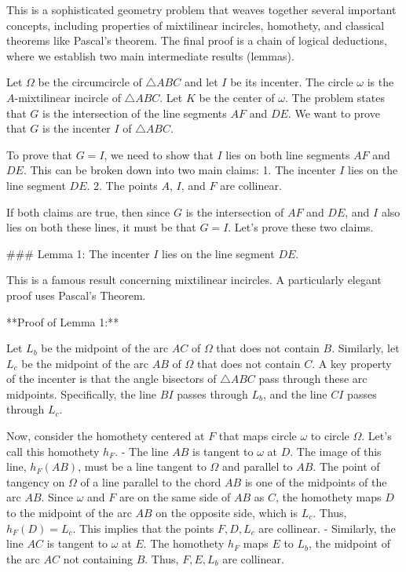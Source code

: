 This is a sophisticated geometry problem that weaves together several important concepts, including properties of mixtilinear incircles, homothety, and classical theorems like Pascal's theorem. The final proof is a chain of logical deductions, where we establish two main intermediate results (lemmas).

Let $\Omega$ be the circumcircle of $\triangle ABC$ and let $I$ be its incenter. The circle $\omega$ is the $A$-mixtilinear incircle of $\triangle ABC$. Let $K$ be the center of $\omega$. The problem states that $G$ is the intersection of the line segments $AF$ and $DE$. We want to prove that $G$ is the incenter $I$ of $\triangle ABC$.

To prove that $G=I$, we need to show that $I$ lies on both line segments $AF$ and $DE$. This can be broken down into two main claims:
1.  The incenter $I$ lies on the line segment $DE$.
2.  The points $A$, $I$, and $F$ are collinear.

If both claims are true, then since $G$ is the intersection of $AF$ and $DE$, and $I$ also lies on both these lines, it must be that $G=I$. Let's prove these two claims.

### Lemma 1: The incenter $I$ lies on the line segment $DE$.

This is a famous result concerning mixtilinear incircles. A particularly elegant proof uses Pascal's Theorem.

**Proof of Lemma 1:**

Let $L_b$ be the midpoint of the arc $AC$ of $\Omega$ that does not contain $B$. Similarly, let $L_c$ be the midpoint of the arc $AB$ of $\Omega$ that does not contain $C$.
A key property of the incenter is that the angle bisectors of $\triangle ABC$ pass through these arc midpoints. Specifically, the line $BI$ passes through $L_b$, and the line $CI$ passes through $L_c$.

Now, consider the homothety centered at $F$ that maps circle $\omega$ to circle $\Omega$. Let's call this homothety $h_F$.
- The line $AB$ is tangent to $\omega$ at $D$. The image of this line, $h_F(AB)$, must be a line tangent to $\Omega$ and parallel to $AB$. The point of tangency on $\Omega$ of a line parallel to the chord $AB$ is one of the midpoints of the arc $AB$. Since $\omega$ and $F$ are on the same side of $AB$ as $C$, the homothety maps $D$ to the midpoint of the arc $AB$ on the opposite side, which is $L_c$. Thus, $h_F(D) = L_c$. This implies that the points $F, D, L_c$ are collinear.
- Similarly, the line $AC$ is tangent to $\omega$ at $E$. The homothety $h_F$ maps $E$ to $L_b$, the midpoint of the arc $AC$ not containing $B$. Thus, $F, E, L_b$ are collinear.

